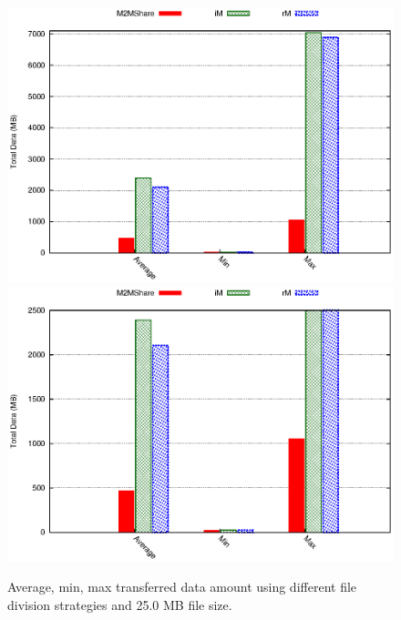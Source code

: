 \begin{figure}[htbp]
\centering%
\subfigure%
{\includegraphics{grafici/dataDFS_25MB.eps}}\qquad\qquad
\subfigure%
{\includegraphics{grafici/dataDFS_25MB_zoom.eps}}
\caption{Average, min, max transferred data amount using different file division strategies and 25.0 MB file size.\label{graficoDataFDS_25MB}}
\end{figure}

